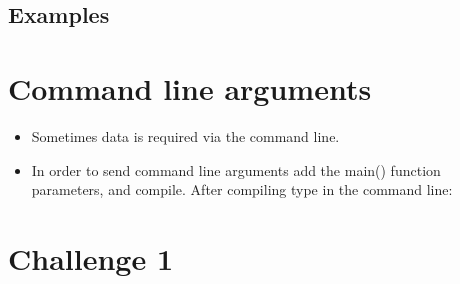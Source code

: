 \subsection{Examples}


\section{Command line arguments}
\begin{itemize}
    \item Sometimes data is required via the command line. 
    \item In order to send command line arguments add the main() function parameters, and compile. After compiling type in the command line:  
\end{itemize}


\section{Challenge 1}
